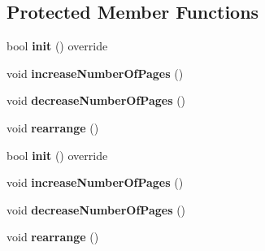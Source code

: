 \subsection*{Protected Member Functions}
\begin{DoxyCompactItemize}
\item 
\mbox{\label{classui_1_1PageViewIndicator_aa3dfc53a9637832023e27364a31d02d6}} 
bool {\bfseries init} () override
\item 
\mbox{\label{classui_1_1PageViewIndicator_ad9f214ed29ea71201283a5673bf14ac4}} 
void {\bfseries increase\+Number\+Of\+Pages} ()
\item 
\mbox{\label{classui_1_1PageViewIndicator_a3d2189db89293cecbc785fd50b664a81}} 
void {\bfseries decrease\+Number\+Of\+Pages} ()
\item 
\mbox{\label{classui_1_1PageViewIndicator_ad4693c11aba6a9664751ad24124cd8f7}} 
void {\bfseries rearrange} ()
\item 
\mbox{\label{classui_1_1PageViewIndicator_aa3dfc53a9637832023e27364a31d02d6}} 
bool {\bfseries init} () override
\item 
\mbox{\label{classui_1_1PageViewIndicator_ad9f214ed29ea71201283a5673bf14ac4}} 
void {\bfseries increase\+Number\+Of\+Pages} ()
\item 
\mbox{\label{classui_1_1PageViewIndicator_a3d2189db89293cecbc785fd50b664a81}} 
void {\bfseries decrease\+Number\+Of\+Pages} ()
\item 
\mbox{\label{classui_1_1PageViewIndicator_ad4693c11aba6a9664751ad24124cd8f7}} 
void {\bfseries rearrange} ()
\end{DoxyCompactItemize}

